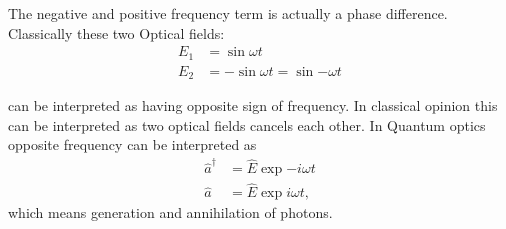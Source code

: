 \documentclass[12pt]{extarticle}
\numberwithin{equation}{section}
\numberwithin{figure}{section}
\numberwithin{table}{section}
\newcommand{\<}{\langle}
\renewcommand{\>}{\rangle}
\theoremstyle{definition}
\begin{document}
\begin{itemize}
                The negative and positive frequency term is actually a phase difference. Classically these two Optical fields:
                \begin{subequations}
                \begin{align}
                    E_1 &= \sin{\omega t}\\
                    E_2 &= -\sin{\omega t} = \sin{-\omega t}
                \end{align}
                \end{subequations}
                
                can be interpreted as having opposite sign of frequency. In classical opinion this can be interpreted as two optical fields cancels each other. In Quantum optics opposite frequency can be interpreted as
                \begin{subequations}
                \begin{align}
                    \hat{a}^\dag &= \hat{E}\exp{-i\omega t}\\
                    \hat{a} &= \hat{E}\exp{i\omega t},
                \end{align}
                \end{subequations}
                which means generation and annihilation of photons.
                

\end{itemize}
\end{document}
